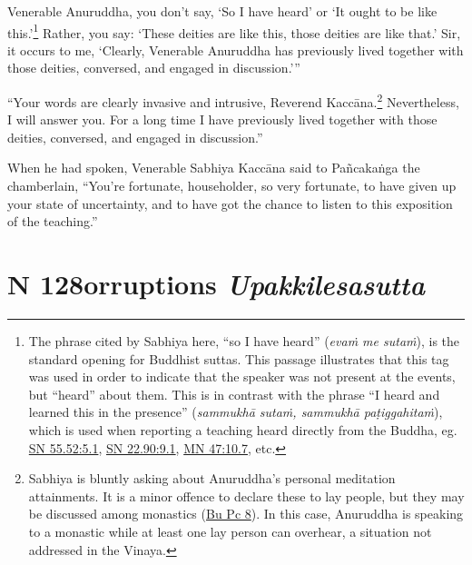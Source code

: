 \documentclass[12pt,openany]{book}%
\newcommand*{\suttatitleacronym}[1]{\smaller[2]{#1}\vspace*{.3em}}
\newcommand*{\suttatitletranslation}[1]{\linebreak{#1}}
\newcommand*{\suttatitleroot}[1]{\linebreak\smaller[2]\itshape{#1}}
\newcommand*{\tocacronym}[1]{\hspace*{-3.3em}{#1}\quad}
\newcommand*{\toctranslation}[1]{#1}
\newcommand*{\tocroot}[1]{(\textit{#1})}
\begin{document}
Venerable Anuruddha, you don’t say, ‘So I have heard’ or ‘It ought to be like this.’\footnote{The phrase cited by Sabhiya here, “so I have heard” (\textit{\textsanskrit{evaṁ} me \textsanskrit{sutaṁ}}), is the standard opening for Buddhist suttas. This passage illustrates that this tag was used in order to indicate that the speaker was not present at the events, but “heard” about them. This is in contrast with the phrase “I heard and learned this in the presence” (\textit{\textsanskrit{sammukhā} \textsanskrit{sutaṁ}, \textsanskrit{sammukhā} \textsanskrit{paṭiggahitaṁ}}), which is used when reporting a teaching heard directly from the Buddha, eg. \href{https://suttacentral.net/sn55.52/en/sujato\#5.1}{SN 55.52:5.1}, \href{https://suttacentral.net/sn22.90/en/sujato\#9.1}{SN 22.90:9.1}, \href{https://suttacentral.net/mn47/en/sujato\#10.7}{MN 47:10.7}, etc. } Rather, you say: ‘These deities are like this, those deities are like that.’ Sir, it occurs to me, ‘Clearly, Venerable Anuruddha has previously lived together with those deities, conversed, and engaged in discussion.’” 

“Your words are clearly invasive and intrusive, Reverend \textsanskrit{Kaccāna}.\footnote{Sabhiya is bluntly asking about Anuruddha’s personal meditation attainments. It is a minor offence to declare these to lay people, but they may be discussed among monastics (\href{https://suttacentral.net/pli-tv-bu-vb-pc8/en/sujato}{Bu Pc 8}). In this case, Anuruddha is speaking to a monastic while at least one lay person can overhear, a situation not addressed in the Vinaya. } Nevertheless, I will answer you. For a long time I have previously lived together with those deities, conversed, and engaged in discussion.” 

When he had spoken, Venerable Sabhiya \textsanskrit{Kaccāna} said to \textsanskrit{Pañcakaṅga} the chamberlain, “You’re fortunate, householder, so very fortunate, to have given up your state of uncertainty, and to have got the chance to listen to this exposition of the teaching.” 

%
\section*{{\suttatitleacronym MN 128}{\suttatitletranslation Corruptions }{\suttatitleroot Upakkilesasutta}}
\addcontentsline{toc}{section}{\tocacronym{MN 128} \toctranslation{Corruptions } \tocroot{Upakkilesasutta}}
\end{document}
